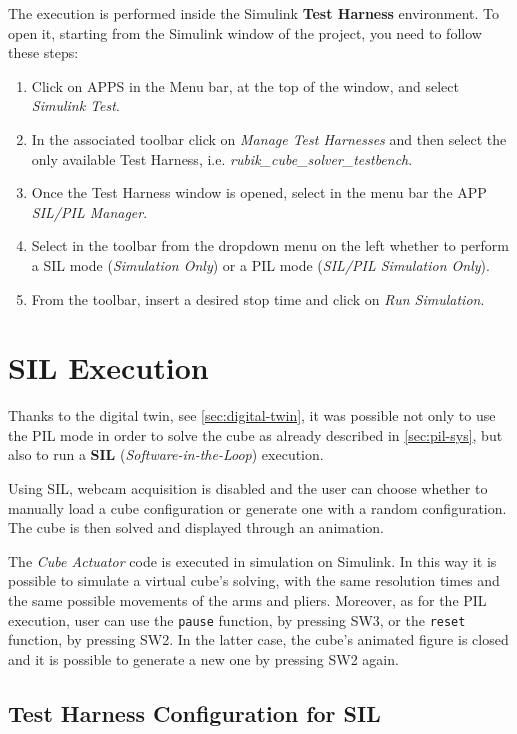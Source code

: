 \documentclass{report}
\begin{document}
The execution is performed inside the Simulink \textbf{Test Harness} environment.
To open it, starting from the Simulink window of the project, you need to follow these steps:
\begin{enumerate}
    \item Click on APPS in the Menu bar, at the top of the window, and select \textit{Simulink Test}.
    \item In the associated toolbar click on \textit{Manage Test Harnesses} and then select the only available Test Harness, i.e. \textit{rubik\_cube\_solver\_testbench}.
    \item Once the Test Harness window is opened, select in the menu bar the APP \textit{SIL/PIL Manager}.
    \item Select in the toolbar from the dropdown menu on the left whether to perform a SIL mode (\textit{Simulation Only}) or a PIL mode (\textit{SIL/PIL Simulation Only}).
    \item From the toolbar, insert a desired stop time and click on \textit{Run Simulation}.  
\end{enumerate}

\section{SIL Execution}\label{sec:sil}
Thanks to the digital twin, see \ref{sec:digital-twin}, it was possible not only to use the PIL mode in order to solve the cube as already described in \ref{sec:pil-sys}, but also to run a \textbf{SIL} (\textit{Software-in-the-Loop}) execution.

Using SIL, webcam acquisition is disabled and the user can choose whether to manually load a cube configuration or generate one with a random configuration. The cube is then solved and displayed through an animation.

The \textit{Cube Actuator} code is executed in simulation on Simulink. In this way it is possible to simulate a virtual cube's solving, with the same resolution times and the same possible movements of the arms and pliers. Moreover, as for the PIL execution, user can use the \texttt{pause} function, by pressing SW3, or the \texttt{reset} function, by pressing SW2. In the latter case, the cube's animated figure is closed and it is possible to generate a new one by pressing SW2 again.

\subsection{Test Harness Configuration for SIL}
\end{document}
